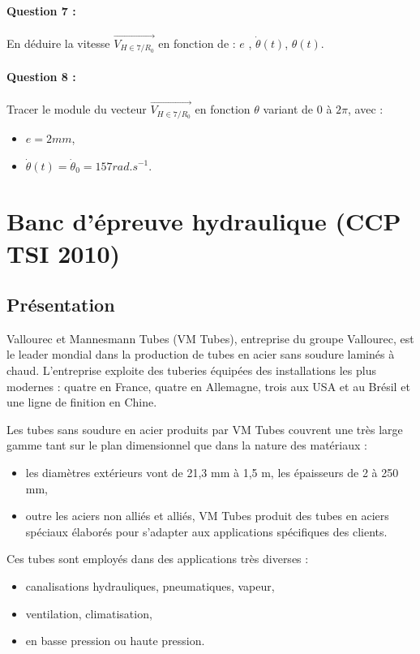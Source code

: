 \paragraph{Question 7 :} En déduire la vitesse $\overrightarrow{V_{H\in 7/R_0}}$ en fonction de : $e$ , $\dot{\theta}(t)$, $\theta(t)$.

\paragraph{Question 8 :} Tracer le module du vecteur $\overrightarrow{V_{H\in 7/R_0}}$ en fonction $\theta$ variant de $0$ à $2\pi$, avec :
\begin{itemize}
 \item $e=2mm$,
 \item $\dot{\theta}(t)=\dot{\theta}_0=157rad.s^{-1}$.
\end{itemize}

\newpage

\section{Banc d'épreuve hydraulique (CCP TSI 2010)}

\subsection{Présentation}

Vallourec et Mannesmann Tubes (VM Tubes), entreprise du groupe Vallourec, est le leader mondial dans la production de tubes en acier sans soudure laminés à chaud. L'entreprise exploite des tuberies équipées des installations les plus modernes : quatre en France, quatre en Allemagne, trois aux USA et au
Brésil et une ligne de finition en Chine.

Les tubes sans soudure en acier produits par VM Tubes couvrent une très large gamme tant sur le plan dimensionnel que dans la nature des matériaux :
\begin{itemize}
 \item les diamètres extérieurs vont de 21,3 mm à 1,5 m, les épaisseurs de 2 à 250 mm,
 \item outre les aciers non alliés et alliés, VM Tubes produit des tubes en aciers spéciaux élaborés pour s'adapter aux applications spécifiques des clients.
 \end{itemize}

Ces tubes sont employés dans des applications très diverses :
\begin{itemize}
 \item canalisations hydrauliques, pneumatiques, vapeur,
 \item ventilation, climatisation,
 \item en basse pression ou haute pression.
\end{itemize}

